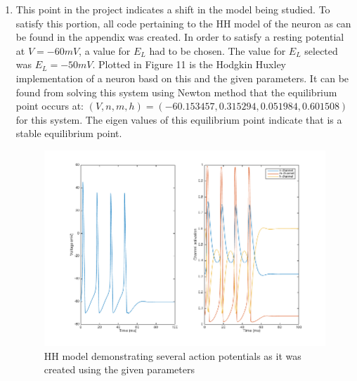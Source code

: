 \documentclass[10pt]{report}
\begin{document}
\begin{enumerate}
%
%
\item This point in the project indicates a shift in the model being studied. To satisfy this portion, all code pertaining to the HH model of the neuron as can be found in the appendix was created. In order to satisfy a resting potential at $V = -60 mV$, a value for $E_L$ had to be chosen. The value for $E_L$ selected was $E_L = -50 mV$. Plotted in Figure 11 is the Hodgkin Huxley implementation of a neuron basd on this and the given parameters. It can be found from solving this system using Newton method that the equilibrium point occurs at: $ (V, n, m, h) = (-60.153457, 0.315294, 0.051984, 0.601508)$ for this system. The eigen values of this equilibrium point indicate that is a stable equilibrium point.\begin{figure}[h!] \includegraphics[scale=0.45]{motnq13.png} \caption[h11]{HH model demonstrating several action potentials as it was created using the given parameters} \end{figure}
%
%

\end{enumerate}
\end{document}

